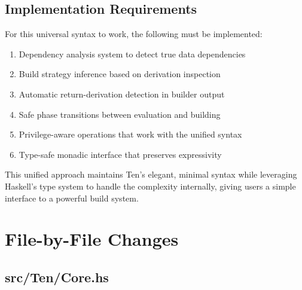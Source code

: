 \documentclass{article}
\begin{document}
\subsection{Implementation Requirements}

For this universal syntax to work, the following must be implemented:

\begin{enumerate}
    \item Dependency analysis system to detect true data dependencies
    \item Build strategy inference based on derivation inspection
    \item Automatic return-derivation detection in builder output
    \item Safe phase transitions between evaluation and building
    \item Privilege-aware operations that work with the unified syntax
    \item Type-safe monadic interface that preserves expressivity
\end{enumerate}

This unified approach maintains Ten's elegant, minimal syntax while leveraging Haskell's type system to handle the complexity internally, giving users a simple interface to a powerful build system.

\newpage
\section{File-by-File Changes}

\subsection{src/Ten/Core.hs}
\end{document}
